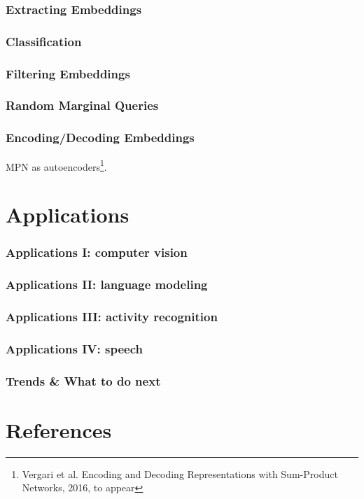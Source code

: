 \documentclass[10pt,t]{beamer}
\begin{document}
\begin{frame}
  \frametitle{Extracting Embeddings}
\end{frame}

\begin{frame}
  \frametitle{Classification}
\end{frame}

\begin{frame}
  \frametitle{Filtering Embeddings}
\end{frame}

\begin{frame}
  \frametitle{Random Marginal Queries}
\end{frame}

\begin{frame}
  \frametitle{Encoding/Decoding Embeddings}
  MPN as autoencoders\footnote{Vergari et al. Encoding and Decoding
    Representations with Sum-Product Networks, 2016, to appear}.
\end{frame}




\section{Applications}
{
  \begin{frame}
    \sectionpage
  \end{frame}
}

\begin{frame}
  \frametitle{Applications I: computer vision}
\end{frame}


\begin{frame}
\frametitle{Applications II: language modeling}
\end{frame}

\begin{frame}
  \frametitle{Applications III: activity recognition}
\end{frame}

\begin{frame}
  \frametitle{Applications IV: speech}
\end{frame}


\begin{frame}
\frametitle{Trends \& What to do next}
\end{frame}

\section{References}
{
  \begin{frame}
    \sectionpage
  \end{frame}
}
\end{document}
